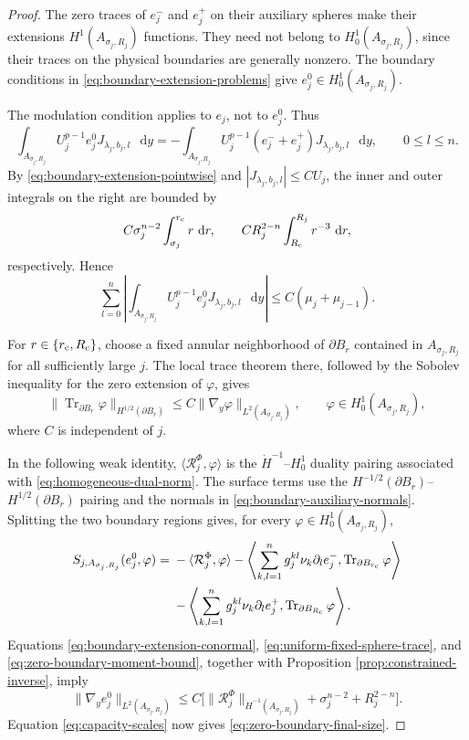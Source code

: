 \documentclass[11pt]{article}
\numberwithin{equation}{section}
\theoremstyle{remark}
\newcommand{\norm}[1]{\lVert #1\rVert}
\newcommand{\dd}{\mathop{}\!\mathrm{d}}
\begin{document}
\begin{proof}
The zero traces of \(e_j^-\) and \(e_j^+\) on their auxiliary spheres
make their extensions \(H^1(A_{\sigma_j,R_j})\) functions. They need
not belong to \(H_0^1(A_{\sigma_j,R_j})\), since their traces on the
physical boundaries are generally nonzero. The boundary conditions in
\eqref{eq:boundary-extension-problems} give
\(e_j^0\in H_0^1(A_{\sigma_j,R_j})\).

The modulation condition applies to \(e_j\), not to \(e_j^0\). Thus
\[
 \int_{A_{\sigma_j,R_j}}U_j^{p-1}e_j^0J_{\lambda_j,b_j,l}\,\dd y
 =-\int_{A_{\sigma_j,R_j}}
 U_j^{p-1}(e_j^-+e_j^+)J_{\lambda_j,b_j,l}\,\dd y,
 \qquad 0\le l\le n.
\]
By \eqref{eq:boundary-extension-pointwise} and
\(|J_{\lambda_j,b_j,l}|\le CU_j\), the inner and outer integrals on the
right are bounded by
\[
 C\sigma_j^{n-2}\int_{\sigma_j}^{r_{\rm c}}r\,\dd r,
 \qquad
 CR_j^{2-n}\int_{R_{\rm c}}^{R_j}r^{-3}\,\dd r,
\]
respectively. Hence
\begin{equation}\label{eq:zero-boundary-moment-bound}
 \sum_{l=0}^n
 \left|\int_{A_{\sigma_j,R_j}}
 U_j^{p-1}e_j^0J_{\lambda_j,b_j,l}\,\dd y\right|
 \le C(\mu_j+\mu_{j-1}).
\end{equation}

For \(r\in\{r_{\rm c},R_{\rm c}\}\), choose a fixed annular
neighborhood of \(\partial B_r\) contained in
\(A_{\sigma_j,R_j}\) for all sufficiently large \(j\). The local trace
theorem there, followed by the Sobolev inequality for the zero extension
of \(\varphi\), gives
\begin{equation}\label{eq:uniform-fixed-sphere-trace}
 \|\operatorname{Tr}_{\partial B_r}\varphi\|_{H^{1/2}(\partial B_r)}
 \le C\|\nabla_y\varphi\|_{L^2(A_{\sigma_j,R_j})},
 \qquad \varphi\in H_0^1(A_{\sigma_j,R_j}),
\end{equation}
where \(C\) is independent of \(j\).

In the following weak identity,
\(\langle\mathcal R_j^\Phi,\varphi\rangle\) is the
\(\dot H^{-1}\)--\(H_0^1\) duality pairing associated with
\eqref{eq:homogeneous-dual-norm}. The surface terms use the
\(H^{-1/2}(\partial B_r)\)--\(H^{1/2}(\partial B_r)\) pairing and the
normals in \eqref{eq:boundary-auxiliary-normals}. Splitting the two
boundary regions gives, for every
\(\varphi\in H_0^1(A_{\sigma_j,R_j})\),
\[
 \begin{aligned}
  S_{j,A_{\sigma_j,R_j}}(e_j^0,\varphi)
 ={}&-\langle\mathcal R_j^\Phi,\varphi\rangle
 -\left\langle\sum_{k,l=1}^ng_j^{kl}\nu_k\partial_le_j^-,
  \operatorname{Tr}_{\partial B_{r_{\rm c}}}\varphi\right\rangle\\
 &-\left\langle\sum_{k,l=1}^ng_j^{kl}\nu_k\partial_le_j^+,
  \operatorname{Tr}_{\partial B_{R_{\rm c}}}\varphi\right\rangle.
 \end{aligned}
\]
Equations  \eqref{eq:boundary-extension-conormal},
\eqref{eq:uniform-fixed-sphere-trace}, and
\eqref{eq:zero-boundary-moment-bound}, together with
Proposition  \ref{prop:constrained-inverse}, imply
\[
 \norm{\nabla_ye_j^0}_{L^2(A_{\sigma_j,R_j})}
 \le C\bigl[
 \norm{\mathcal R_j^\Phi}_{\dot H^{-1}(A_{\sigma_j,R_j})}
 +\sigma_j^{n-2}+R_j^{2-n}\bigr].
\]
Equation  \eqref{eq:capacity-scales} now gives
\eqref{eq:zero-boundary-final-size}.


\end{proof}
\end{document}
